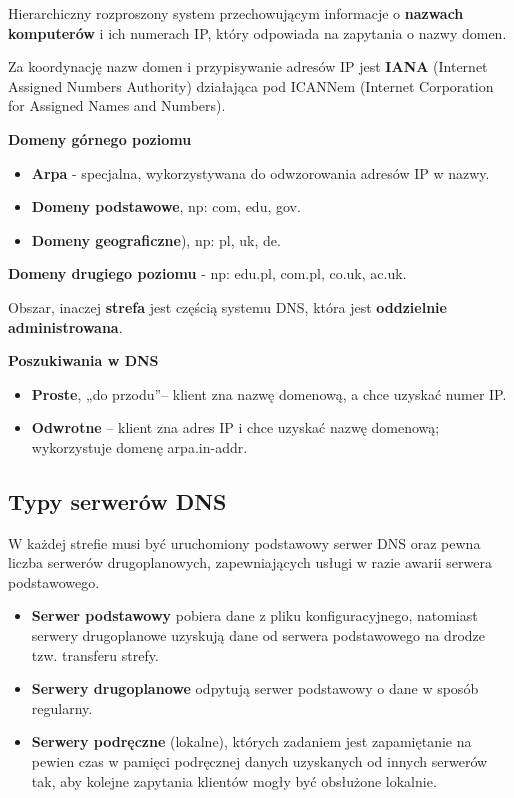 \documentclass[../main.tex]{subfiles}
\begin{document}
    Hierarchiczny rozproszony system przechowującym informacje o \textbf{nazwach komputerów} i
    ich numerach IP, który odpowiada na zapytania o nazwy domen.

    Za koordynację nazw domen i przypisywanie adresów IP jest \textbf{IANA} (Internet Assigned Numbers
    Authority) działająca pod ICANNem (Internet Corporation for Assigned Names and Numbers).

    \textbf{Domeny górnego poziomu}
    \begin{itemize}
        \item \textbf{Arpa} - specjalna, wykorzystywana do odwzorowania adresów IP w nazwy.
        \item \textbf{Domeny podstawowe}, np: com, edu, gov.
        \item \textbf{Domeny geograficzne}), np: pl, uk, de.
    \end{itemize}

    \textbf{Domeny drugiego poziomu} - np: edu.pl, com.pl, co.uk, ac.uk.

    Obszar, inaczej \textbf{strefa} jest częścią systemu DNS, która jest \textbf{oddzielnie administrowana}.

    \textbf{Poszukiwania w DNS}
    \begin{itemize}
        \item \textbf{Proste}, „do przodu”– klient zna nazwę domenową, a chce uzyskać numer IP.
        \item \textbf{Odwrotne} – klient zna adres IP i chce uzyskać nazwę domenową; wykorzystuje domenę arpa.in-addr.
    \end{itemize}

    \subsection{Typy serwerów DNS}
    W każdej strefie musi być uruchomiony podstawowy serwer DNS oraz pewna liczba
    serwerów drugoplanowych, zapewniających usługi w razie awarii serwera podstawowego.

    \begin{itemize}
        \item \textbf{Serwer podstawowy} pobiera dane z pliku konfiguracyjnego, natomiast serwery
        drugoplanowe uzyskują dane od serwera podstawowego na drodze tzw. transferu strefy.
        \item \textbf{Serwery drugoplanowe} odpytują serwer podstawowy o dane w sposób
        regularny.
        \item \textbf{Serwery podręczne} (lokalne), których zadaniem jest zapamiętanie na pewien czas w
        pamięci podręcznej danych uzyskanych od innych serwerów tak, aby kolejne zapytania
        klientów mogły być obsłużone lokalnie.
    \end{itemize}
\end{document}

